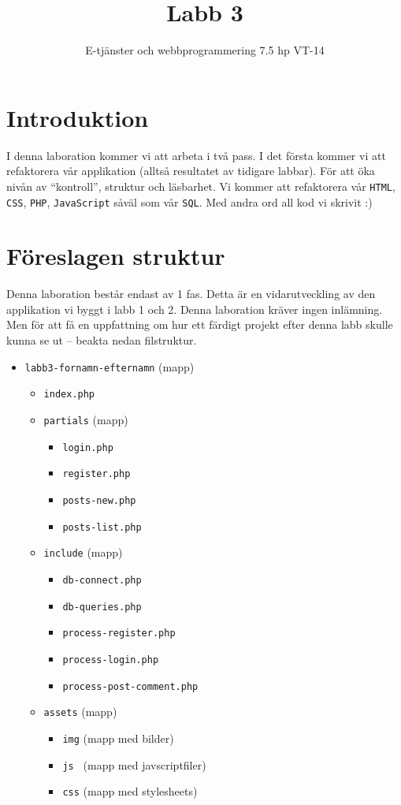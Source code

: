 \documentclass[12pt]{article}
\date{}
\title{ Labb 3 }
\author{ E-tjänster och webbprogrammering 7.5 hp VT-14 }
\begin{document}
\maketitle
\vspace{-2em}



\section{Introduktion}
I denna laboration kommer vi att arbeta i två pass. I det första kommer vi att refaktorera vår applikation (alltså resultatet av tidigare labbar). För att öka nivån av ``kontroll'', struktur och läsbarhet. Vi kommer att refaktorera vår \texttt{HTML}, \texttt{CSS}, \texttt{PHP}, \texttt{JavaScript} såväl som vår \texttt{SQL}. Med andra ord all kod vi skrivit :)


\pagebreak
\section{Föreslagen struktur}
Denna laboration består endast av 1 fas. Detta är en vidarutveckling av den applikation vi byggt i labb 1 och 2. Denna laboration kräver ingen inlämning. Men för att få en uppfattning om hur ett färdigt projekt efter denna labb skulle kunna se ut -- beakta nedan filstruktur.
\begin{itemize}
  \item \texttt{labb3-fornamn-efternamn} (mapp)
  \begin{itemize}
    \item \texttt{index.php}
    \item \texttt{partials} (mapp)
      \begin{itemize}
        \item \texttt{login.php}
        \item \texttt{register.php}
        \item \texttt{posts-new.php}
        \item \texttt{posts-list.php}
      \end{itemize}
    \item \texttt{include} (mapp)
      \begin{itemize}
        \item \texttt{db-connect.php}
        \item \texttt{db-queries.php}
        \item \texttt{process-register.php}
        \item \texttt{process-login.php}
        \item \texttt{process-post-comment.php}
      \end{itemize}
    \item \texttt{assets} (mapp)
    \begin{itemize}
      \item \texttt{img} (mapp med bilder)
      \item \texttt{js } (mapp med javscriptfiler)
      \item \texttt{css} (mapp med stylesheets)
    \end{itemize}
  \end{itemize}
\end{itemize}
\end{document}
